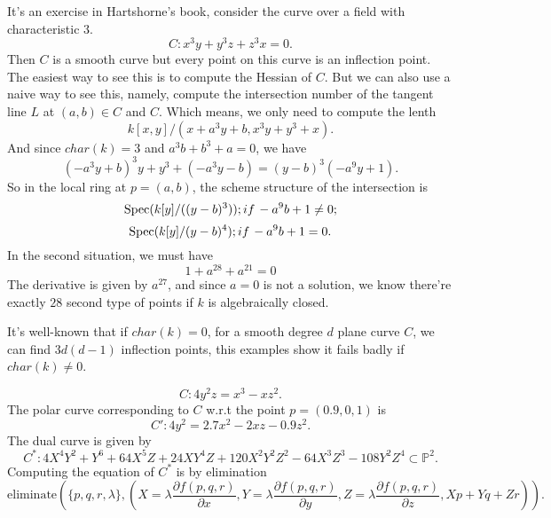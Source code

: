\documentclass[../main.tex]{subfiles}
\begin{document}
\begin{example}
It's an exercise in Hartshorne's book, consider the curve over a field with characteristic $3$.
$$C: x^{3}y+y^{3}z+z^{3}x=0.$$
Then $C$ is a smooth curve but every point on this curve is an inflection point. The easiest way to see this is to compute the Hessian of $C$. But we can also use a naive way to see this, namely, compute the intersection number of the tangent line $L$ at $(a,b)\in C$ and $C$. Which means, we only need to compute the lenth 
$$k[x,y]/(x+a^{3}y+b, x^{3}y+y^{3}+x).$$
And since $char(k)=3$ and $a^{3}b+b^{3}+a=0$, we have 
$$(-a^{3}y+b)^{3}y+y^{3}+(-a^{3}y-b)=(y-b)^{3}(-a^{9}y+1).$$
So in the local ring at $p=(a,b)$, the scheme structure of the intersection is 
$$\mathrm{Spec}(k[y]/((y-b)^{3})); if\hspace{0.5mm} -a^{9}b+1\neq 0;$$
$$\mathrm{Spec}(k[y]/(y-b)^{4}); if \hspace{0.5mm} -a^{9}b+1=0.$$
In the second situation, we must have 
$$1+a^{28}+a^{21}=0$$
The derivative is given by $a^{27}$, and since $a=0$ is not a solution, we know there're exactly $28$ second type of points if $k$ is algebraically closed. 
\end{example}
\begin{remark}
It's well-known that if $char(k)=0$, for a smooth degree $d$ plane curve $C$, we can find $3d(d-1)$ inflection points, this examples show it fails badly if $char(k)\neq 0$.
\end{remark}


\begin{example}
$$C: 4y^{2}z = x^{3} − xz^{2}.$$
The polar curve corresponding to $C$ w.r.t the point $p=(0.9,0,1)$ is 
$$C': 4y^{2}=2.7x^{2}-2xz-0.9z^{2}.$$
The dual curve  is given by 
$$C^{*}:4X^{4}Y^{2}+Y^{6}+64X^{5}Z+24XY^{4}Z+120X^{2}Y^{2}Z^{2}-64X^{3}Z^{3}-108Y^{2}Z^{4}\subset \mathbb{P}^{2}.$$
Computing the equation of $C^{*}$ is by elimination
$$\mathrm{eliminate}(\{p,q,r,\lambda\}, (X=\lambda \frac{\partial f(p,q,r)}{\partial x}, Y=\lambda \frac{\partial f(p,q,r)}{\partial y}, Z=\lambda \frac{\partial f(p,q,r)}{\partial z}, Xp+Yq+Zr)).$$
\end{example}
\end{document}
